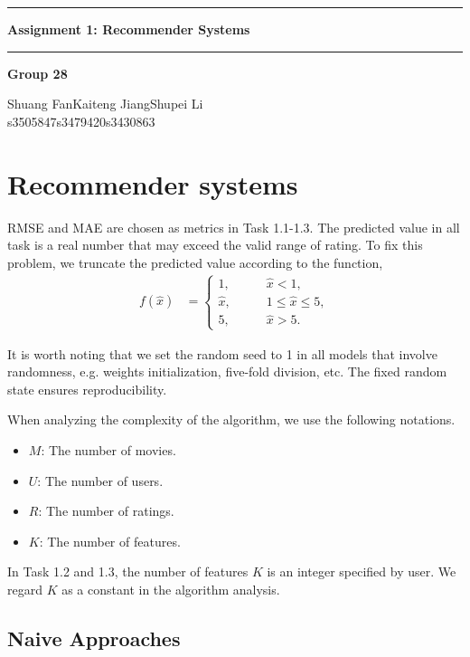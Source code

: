 \documentclass{article}
\begin{document}
\noindent\rule{\textwidth}{1pt}
\begin{center}
    \LARGE \textbf{Assignment 1: Recommender Systems}
\end{center}
\noindent\rule{\textwidth}{0.5pt}
\begin{center}
    \textbf{Group 28}\par
    \vspace{0.3cm}
Shuang Fan\phantom{space}Kaiteng Jiang\phantom{space}Shupei Li\\
s3505847\phantom{spacespac}s3479420\phantom{spacespa}s3430863
\end{center}
\section{Recommender systems}
RMSE and MAE are chosen as metrics in Task 1.1-1.3. The predicted value in all task is a real number that may exceed the valid range of rating. To fix this problem, we truncate the predicted value according to the function,
\begin{align*}
    f(\hat{x}) &= 
    \begin{cases}
        1,\qquad &\hat{x} < 1,\\
        \hat{x},\qquad &1\leq \hat{x} \leq 5,\\
        5, \qquad &\hat{x} > 5.
    \end{cases}
\end{align*}
\par
It is worth noting that we set the random seed to 1 in all models that involve randomness, e.g. weights initialization, five-fold division, etc. The fixed random state ensures reproducibility.\par
When analyzing the complexity of the algorithm, we use the following notations.
\begin{itemize}
    \item $M$: The number of movies.
    \item $U$: The number of users.
    \item $R$: The number of ratings.
    \item $K$: The number of features.
\end{itemize}
In Task 1.2 and 1.3, the number of features $K$ is an integer specified by user. We regard $K$ as a constant in the algorithm analysis.\par

\subsection{Naive Approaches}
\end{document}
